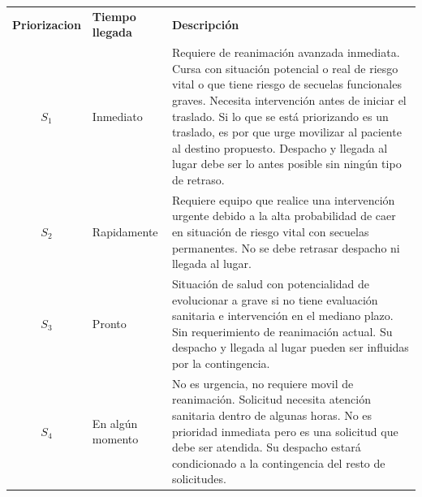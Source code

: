 \documentclass{article}
\begin{document}
\begin{table}[H]
\centering
\label{my-label}
\begin{tabular}{c l p{9cm} }
\textbf{Priorizacion} & \textbf{Tiempo llegada} & \textbf{Descripci\'on} \\
\rowcolor[HTML]{EFEFEF} 
$S{_1}$                    & Inmediato                       
& Requiere de reanimaci\'on avanzada inmediata. Cursa con situación potencial o real de riesgo vital o que tiene riesgo de secuelas funcionales graves. Necesita intervención antes de iniciar el traslado. Si lo que se está priorizando es un traslado, es por que urge movilizar al paciente al destino propuesto. Despacho y llegada al lugar debe ser lo antes posible sin ningún tipo de retraso.
\\
$S{_2}$                    & Rapidamente                       
& Requiere equipo que realice una intervención urgente debido a la alta probabilidad de caer en situación de riesgo vital con secuelas permanentes. No se debe retrasar despacho ni llegada al lugar.
\\
\rowcolor[HTML]{EFEFEF} 
$S{_3}$                    & Pronto                        
& Situación de salud con potencialidad de evolucionar a grave si no tiene evaluación sanitaria e intervención en el mediano plazo. Sin requerimiento de reanimaci\'on actual. Su despacho y llegada al lugar pueden ser influidas por la contingencia.
\\
$S{_4}$                    & En alg\'un momento                        
& No es urgencia, no requiere movil de reanimaci\'on. Solicitud necesita atenci\'on sanitaria dentro de algunas horas. No es prioridad inmediata pero es una solicitud que debe ser atendida. Su despacho estará condicionado a la contingencia del resto de solicitudes.

\end{tabular}
\end{table}
\end{document}

